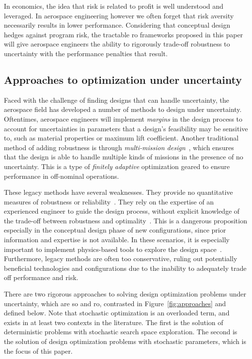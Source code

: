In economics, the idea that risk is related to profit is well understood and leveraged.
In aerospace engineering however we often forget that risk aversity necessarily results in lower performance.
Considering that conceptual design hedges against program risk,
the tractable \gls{ro} frameworks proposed in this paper will
give aerospace engineers the ability to rigorously trade-off robustness to uncertainty with the performance penalties
that result.

\subsection{Approaches to optimization under uncertainty}
\label{sec:approaches}

Faced with the challenge of finding designs that can handle uncertainty,
the aerospace field has developed a number of methods to
design under uncertainty. Oftentimes, aerospace engineers will implement
\emph{margins} in the design process to account for uncertainties in parameters that a design's feasibility
may be sensitive to, such as material properties or maximum lift coefficient.
Another traditional method of adding robustness is through \emph{multi-mission design}~\cite{York2018},
which ensures that the design is able to handle
multiple kinds of missions in the presence of no uncertainty. This is a type of \emph{finitely
adaptive} optimization geared to ensure performance in off-nominal operations.

These legacy methods have several weaknesses. They provide no quantitative measures of
robustness or reliability~\cite{Zang2002}. They rely on the expertise of an experienced
engineer to guide the design process, without explicit knowledge of the trade-off between
robustness and optimality~\cite{Yao2011}. This is a dangerous proposition especially in the
conceptual design phase of new configurations, since prior information and expertise is not
available. In these scenarios, it is especially important to implement physics-based tools
to explore the design space~\cite{York2018}. Furthermore,
legacy methods are often too conservative, ruling out potentially beneficial technologies
and configurations due to the inability to adequately trade off performance and risk.

There are two rigorous approaches to solving design optimization problems under uncertainty,
which are \gls{so} and \gls{ro}, {\color{blue}contrasted in Figure~\ref{fig:approaches} and defined below}. Note that stochastic
optimization is an overloaded term, and exists in at least two contexts in the literature. The first is the solution
of deterministic problems with stochastic search space exploration. The second is the solution
of design optimization problems with stochastic parameters, which is the focus of this paper.

